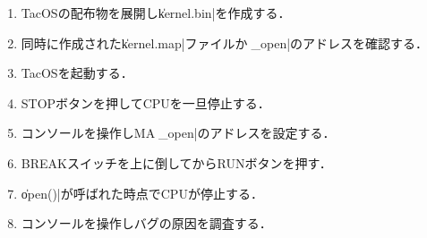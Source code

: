 \begin{enumerate}
\item TacOSの配布物を展開し\|kernel.bin|を作成する．
\item 同時に作成された\|kernel.map|ファイルから\|_open|のアドレスを確認する．
\item TacOSを起動する．
\item STOPボタンを押してCPUを一旦停止する．
\item コンソールを操作しMAに\|_open|のアドレスを設定する．
\item BREAKスイッチを上に倒してからRUNボタンを押す．
\item \|open()|が呼ばれた時点でCPUが停止する．
\item コンソールを操作しバグの原因を調査する．
\end{enumerate}
